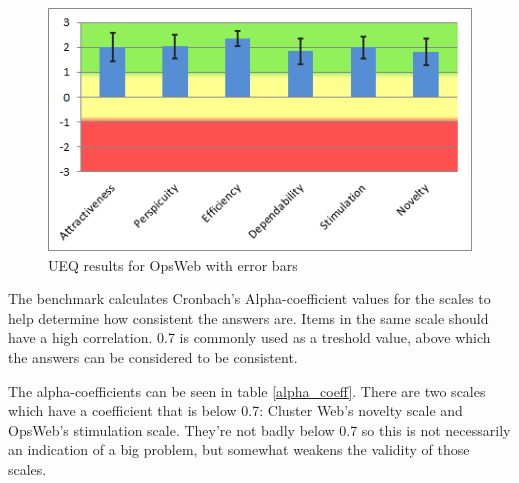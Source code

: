 \begin{figure}[ht]
  \begin{center}
    \includegraphics*[width=1\textwidth]{ow_ueq_error_bars}
  \end{center}
  \caption{UEQ results for OpsWeb with error bars}
  \label{fig:ow_ueq_error_bars}
\end{figure}

The benchmark calculates Cronbach's Alpha-coefficient values for the scales to help determine how consistent the answers are. Items in the same scale should have a high correlation. 0.7 is commonly used as a treshold value, above which the answers can be considered to be consistent.

The alpha-coefficients can be seen in table \ref{alpha_coeff}. There are two scales which have a coefficient that is below 0.7: Cluster Web's novelty scale and OpsWeb's stimulation scale. They're not badly below 0.7 so this is not necessarily an indication of a big problem, but somewhat weakens the validity of those scales.

